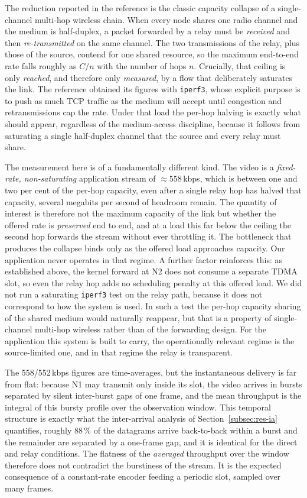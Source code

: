 The reduction reported in the reference is the classic capacity collapse of a
single-channel multi-hop wireless chain. When every node shares one radio
channel and the medium is half-duplex, a packet forwarded by a relay must be
\emph{received} and then \emph{re-transmitted} on the same channel. The two
transmissions of the relay, plus those of the source, contend for one shared resource,
so the maximum end-to-end rate falls roughly as $C/n$ with the number of hops
$n$. Crucially, that ceiling is only \emph{reached}, and therefore only
\emph{measured}, by a flow that deliberately saturates the link. The reference
obtained its figures with \texttt{iperf3}, whose explicit purpose is to push as
much TCP traffic as the medium will accept until congestion and retransmissions
cap the rate. Under that load the per-hop halving is exactly what should appear,
regardless of the medium-access discipline, because it follows from saturating a
single half-duplex channel that the source and every relay must share.

The measurement here is of a fundamentally different kind. The video is a
\emph{fixed-rate, non-saturating} application stream of $\approx 558$\,kbps,
which is between one and two per cent of the per-hop capacity, even after a
single relay hop has halved that capacity, several megabits per second of
headroom remain. The quantity of interest is therefore not the maximum
capacity of the link but whether the offered rate is \emph{preserved} end to end, and at a
load this far below the ceiling the second hop forwards the stream without ever
throttling it. The bottleneck that produces the collapse binds only as the
offered load approaches capacity. Our application never operates in that
regime. A further factor reinforces this: as established above, the kernel
forward at N2 does not consume a separate TDMA slot, so even the relay hop adds
no scheduling penalty at this offered load. We did not run a saturating
\texttt{iperf3} test on the relay
path, because it does not correspond to how the system is used. In such a test
the per-hop capacity sharing of the shared medium would naturally reappear, but
that is a property of single-channel multi-hop wireless rather than of the
forwarding design. For the application this system is built to carry, the
operationally relevant regime is the source-limited one, and in that regime the
relay is transparent.

The 558/552\,kbps figures are time-averages, but the instantaneous delivery is
far from flat: because N1 may transmit only inside its slot, the video arrives
in bursts separated by silent inter-burst gaps of one frame, and the mean
throughput is the integral of this bursty profile over the observation window.
This temporal structure is exactly what the inter-arrival analysis of
Section~\ref{subsec:res-ia} quantifies, roughly 88\,\% of the datagrams
arrive back-to-back within a burst and the remainder are separated by a
one-frame gap, and it is identical for the direct and relay conditions. The
flatness of the \emph{averaged} throughput over the window therefore does not
contradict the burstiness of the stream. It is the expected consequence of a
constant-rate encoder feeding a periodic slot, sampled over many frames.

